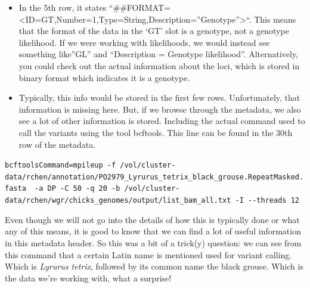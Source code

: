 \documentclass[
  letterpaper,
  DIV=11,
  numbers=noendperiod]{scrreprt}
\begin{document}
\begin{tcolorbox}[enhanced jigsaw, arc=.35mm, left=2mm, titlerule=0mm, rightrule=.15mm, colframe=quarto-callout-tip-color-frame, coltitle=black, colback=white, opacityback=0, bottomtitle=1mm, bottomrule=.15mm, colbacktitle=quarto-callout-tip-color!10!white, breakable, title=\textcolor{quarto-callout-tip-color}{\faLightbulb}\hspace{0.5em}{Answers}, toptitle=1mm, toprule=.15mm, opacitybacktitle=0.6, leftrule=.75mm]

\begin{itemize}
\item
  In the 5th row, it states
  ``\#\#FORMAT=\textless ID=GT,Number=1,Type=String,Description=''Genotype''\textgreater{}``.
  This means that the format of the data in the `GT' slot is a genotype,
  not a genotype likelihood. If we were working with likelihoods, we
  would instead see something like''GL'' and ``Description = Genotype
  likelihood''. Alternatively, you could check out the actual
  information about the loci, which is stored in binary format which
  indicates it is a genotype.
\item
  Typically, this info would be stored in the first few rows.
  Unfortunately, that information is missing here. But, if we browse
  through the metadata, we also see a lot of other information is
  stored. Including the actual command used to call the variants using
  the tool bcftools. This line can be found in the 30th row of the
  metadata.
\end{itemize}

\texttt{bcftoolsCommand=mpileup\ -f\ /vol/cluster-data/rchen/annotation/PO2979\_Lyrurus\_tetrix\_black\_grouse.RepeatMasked.fasta\ \ -a\ DP\ -C\ 50\ -q\ 20\ -b\ /vol/cluster-data/rchen/wgr/chicks\_genomes/output/list\_bam\_all.txt\ -I\ -\/-threads\ 12}

Even though we will not go into the details of how this is typically
done or what any of this means, it is good to know that we can find a
lot of useful information in this metadata header. So this was a bit of
a trick(y) question: we can see from this command that a certain Latin
name is mentioned used for variant calling. Which is \emph{Lyrurus
tetrix}, followed by its common name the black grouse. Which is the data
we're working with, what a surprise!


\end{tcolorbox}
\end{document}
